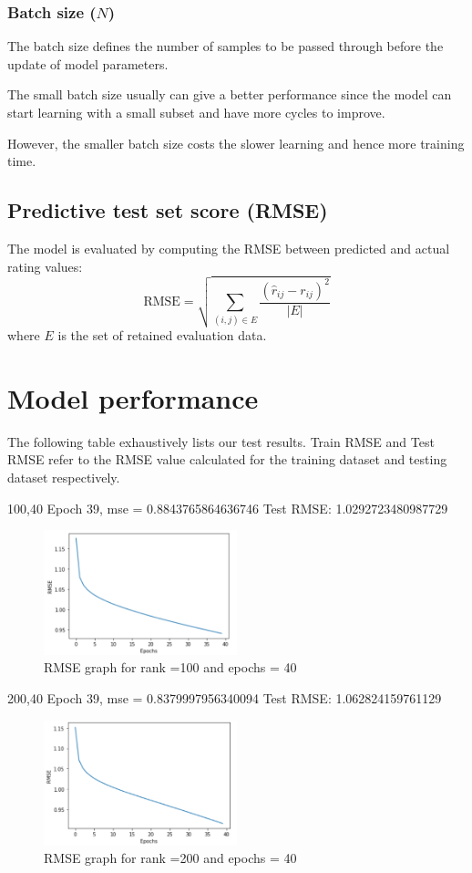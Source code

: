 \documentclass[final]{cvpr}
\begin{document}
\subsubsection{Batch size ($N$)}
The batch size defines the number of samples to be passed through before the update of model parameters.

The small batch size usually can give a better performance since the model can start learning with a small subset and have more cycles to improve.

However, the smaller batch size costs the slower learning and hence more training time.

\subsection{Predictive test set score (RMSE)}
The model is evaluated by computing the RMSE between predicted and actual rating values:
$$ \text{RMSE} = \sqrt{\sum_{(i, j) \in E} \frac{{(\hat r_{ij} - r_{ij})}^2}{\left| E \right|}} $$
where $E$ is the set of retained evaluation data.

\section{Model performance}
The following table exhaustively lists our test results. Train RMSE and Test RMSE refer to the RMSE value calculated for the training dataset and testing dataset respectively.

100,40
Epoch 39, mse = 0.8843765864636746
Test RMSE: 1.0292723480987729

\begin{figure}[h]
	\includegraphics[width=0.5\textwidth]{./100_40_graph.PNG}
	\caption{RMSE graph for rank =100 and epochs = 40}
\end{figure}

200,40
Epoch 39, mse = 0.8379997956340094
Test RMSE: 1.062824159761129

\begin{figure}[h]
	\includegraphics[width=0.5\textwidth]{./200_40_graph.PNG}
	\caption{RMSE graph for rank =200 and epochs = 40}
\end{figure}
\end{document}
